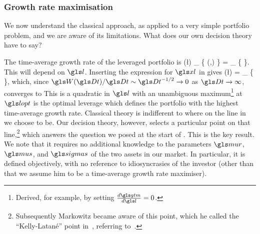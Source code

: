 \subsubsection{Growth rate maximisation}
We now understand the classical approach, as applied to a very simple portfolio problem, and we are aware of its limitations. What does our own decision theory have to say?

The time-average growth rate of the leveraged portfolio is
\be
\gtm(\l) \equiv \lim_{\Dt\to\infty} \left\{ \gm(\xl,\Dt) \right\} = \lim_{\Dt\to\infty} \left\{ \frac{\D\ln \xl}{\Dt} \right\}.
\ee
This will depend on $\l$. Inserting the expression for $\xl$ in  gives
\be
\gtm(\l) = \lim_{\Dt\to\infty} \left\{   \right\},
\ee
which, since $\gW(\Dt)/\Dt\sim\Dt^{-1/2}\to0$ as $\Dt\to\infty$, converges to
\be
{}
\ee
This is a quadratic in $\l$ with an unambiguous maximum\footnote{Derived, for example, by setting $\frac{d\gtm}{d\l}=0$.} at
\be
{}
\ee
$\lopt$ is the optimal leverage which defines the portfolio with the highest time-average growth rate. Classical theory is indifferent to where on the line in  we choose to be. Our decision theory, however, selects a particular point on that line,\footnote{Subsequently Markowitz became aware of this point, which he called the ``Kelly-Latan\'{e}'' point in~\cite{Markowitz1976}, referring to~\cite{Kelly1956,Latane1959}.} which answers the question we posed at the start of . This is the key result. We note that it requires no additional knowledge to the parameters $\mur$, $\mus$, and $\sigmas$ of the two assets in our market. In particular, it is defined objectively, with no reference to idiosyncrasies of the investor (other than that we assume him to be a time-average growth rate maximiser).

